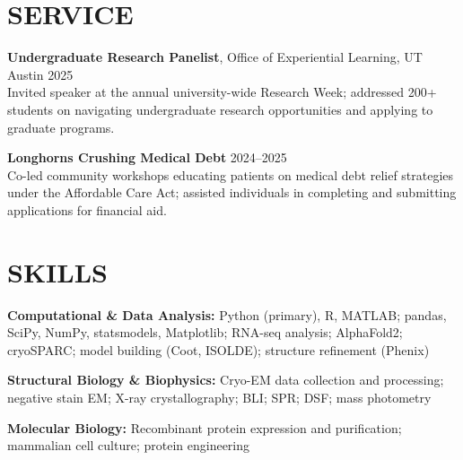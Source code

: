 \documentclass[11pt]{article}
\begin{document}
\section*{SERVICE}

\textbf{Undergraduate Research Panelist}, Office of Experiential Learning, UT Austin \hfill 2025\\
Invited speaker at the annual university-wide Research Week; addressed 200+ students on navigating undergraduate research opportunities and applying to graduate programs.

\vspace{4pt}

\textbf{Longhorns Crushing Medical Debt} \hfill 2024--2025\\
Co-led community workshops educating patients on medical debt relief strategies under the Affordable Care Act; assisted individuals in completing and submitting applications for financial aid.


\section*{SKILLS}

\textbf{Computational \& Data Analysis:} Python (primary), R, MATLAB; pandas, SciPy, NumPy, statsmodels, Matplotlib; RNA-seq analysis; AlphaFold2; cryoSPARC; model building (Coot, ISOLDE); structure refinement (Phenix)

\textbf{Structural Biology \& Biophysics:} Cryo-EM data collection and processing; negative stain EM; X-ray crystallography; BLI; SPR; DSF; mass photometry

\textbf{Molecular Biology:} Recombinant protein expression and purification; mammalian cell culture; protein engineering
\end{document}
